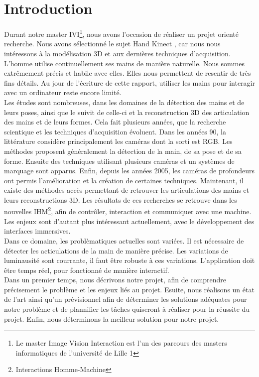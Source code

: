 \chapter*{Introduction}

Durant notre master IVI\footnote{Le master Image Vision Interaction est 
l'un des parcours des masters informatiques de l'université de Lille 1}, 
nous avons l'occasion de réaliser un projet orienté recherche. Nous avons 
sélectionné le sujet \og Hand Kinect \fg, car nous nous intéressons à la 
modélisation 3D et aux dernières techniques d'acquisition. \\

L'homme utilise continuellement ses mains de manière naturelle. Nous 
sommes extrêmement précis et habile avec elles. Elles nous permettent 
de resentir de très fins détails. Au jour de l'écriture de cette rapport,
utiliser les mains pour interagir avec un ordinateur reste encore limité.\\

Les études sont nombreuses, dans les domaines de la détection des mains 
et de leurs poses, ainsi que le suivit de celle-ci et la reconstruction 
3D des articulation des mains et de leurs formes. Cela fait plusieurs années, 
que la recherche scientique et les techniques d'acquisition évoluent. 
Dans les années 90, la littérature considère principalement les caméras 
dont la sorti est RGB. Les méthodes proposent généralement la détection 
de la main, de sa pose et de sa forme. Ensuite des techniques utilisant 
plusieurs caméras et un systèmes de marquage sont apparus. Enfin, depuis 
les années 2005, les caméras de profondeurs ont permis l'amélioration 
et la création de certaines techniques. Maintenant, il existe des méthodes 
accès permettant de retrouver les articulations des mains et leurs 
reconstructions 3D. Les résultats de ces recherches se retrouve dans les 
nouvelles IHM\footnote{Interactions Homme-Machine}, afin de contrôler, 
interaction et communiquer avec une machine. Les enjeux sont d'autant plus 
intéressant actuellement, avec le développement des interfaces 
immersives.\\

Dans ce domaine, les problèmatiques actuelles sont variées. Il est 
nécessaire de détecter les acticulations de la main de manière précise. 
Les variations de luminausité sont courrante, il faut être robuste à 
ces variations. L'application doit être temps réel, pour fonctionné de 
manière interactif.\\


Dans un premier temps, nous décrivons notre projet, afin de comprendre 
précisement le problème et les enjeux liés au projet. Esuite, nous réalisons 
un état de l'art ainsi qu'un prévisionnel afin de déterminer les solutions 
adéquates pour notre problème et de plannifier les tâches quiseront à 
réaliser pour la réussite du projet. Enfin, nous déterminons la meilleur 
solution pour notre projet.



